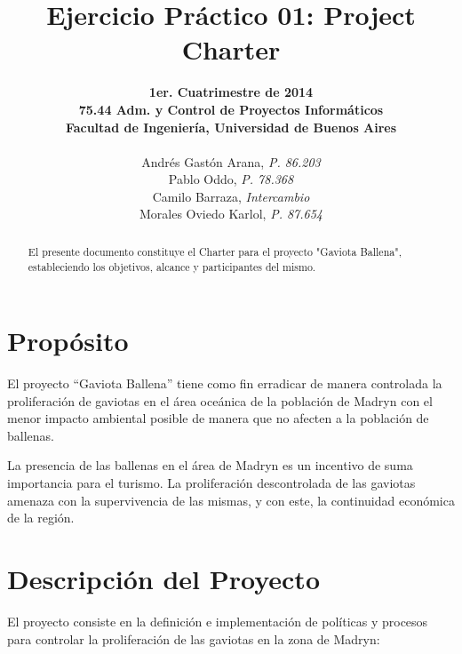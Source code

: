 \documentclass[a4paper,11pt]{article}
\title{\textbf{Ejercicio Práctico 01: Project Charter}}
\author{
  \normalsize{\textbf{1er. Cuatrimestre de 2014}} \\
  \normalsize{\textbf{75.44 Adm. y Control de Proyectos Informáticos}} \\
  \normalsize{\textbf{Facultad de Ingeniería, Universidad de Buenos Aires}} \\
  \\
  Andrés Gastón Arana, \textit{P. 86.203} \\
  Pablo Oddo, \textit{P. 78.368} \\
  Camilo Barraza, \textit{Intercambio} \\
  Morales Oviedo Karlol, \textit{P. 87.654} \\
}
\date{}
\begin{document}
\thispagestyle{empty}
\maketitle

\begin{abstract}

  El presente documento constituye el Charter para el proyecto "Gaviota
  Ballena", estableciendo los objetivos, alcance y participantes del mismo.

\end{abstract}

\clearpage

\tableofcontents
\clearpage


\section{Propósito}

El proyecto “Gaviota Ballena” tiene como fin erradicar de manera controlada la
proliferación de gaviotas en el área oceánica de la población de Madryn con el
menor impacto ambiental posible de manera que no afecten a la población de
ballenas.

La presencia de las ballenas en el área de Madryn es un incentivo de suma
importancia para el turismo. La proliferación descontrolada de las gaviotas
amenaza con la supervivencia de las mismas, y con este, la continuidad
económica de la región.

\section{Descripción del Proyecto}

El proyecto consiste en la definición e implementación de políticas y procesos
para controlar la proliferación de las gaviotas en la zona de Madryn:
\end{document}
